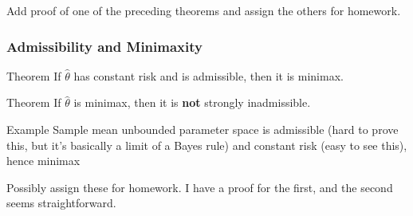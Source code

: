 \begin{frame}
Add proof of one of the preceding theorems and assign the others for homework.
\end{frame}
\begin{frame}
  \frametitle{Admissibility and Minimaxity}

  \begin{block}{Theorem}
    If $\widehat{\theta}$ has constant risk and is admissible, then it is minimax.
  \end{block}

  \begin{block}{Theorem}
    If $\widehat{\theta}$ is minimax, then it is \textbf{not} strongly inadmissible.
  \end{block}


  \begin{block}{Example}
    \alert{Sample mean unbounded parameter space is admissible (hard to prove this, but it's basically a limit of a Bayes rule) and constant risk (easy to see this), hence minimax}
  \end{block}

  \alert{Possibly assign these for homework. I have a proof for the first, and the second seems straightforward.}
\end{frame}


